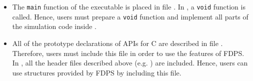 \begin{itemize}[leftmargin=*]
\item The \texttt{main} function of the executable is placed in file . In , a \texttt{void} function  is called. Hence, users must prepare a \texttt{void} function  and implement all parts of the simulation code inside .
\item All of the prototype declarations of APIs for C are described in file . Therefore, users must include this file in order to use the features of FDPS. In , all the header files described above (e.g. ) are included. Hence, users can use structures provided by FDPS by including this file.
\end{itemize}

